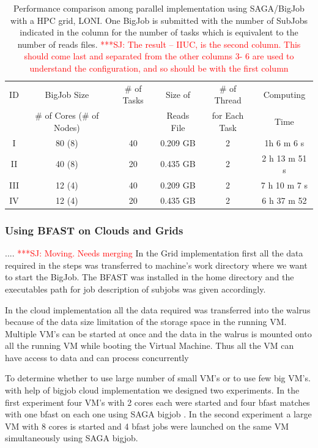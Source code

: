 \documentclass[12pt]{article}
\newcommand{\jhanote}[1]{ {\textcolor{red}     {***SJ: #1}}}
\newcommand{\jhanote}[1]{}
\begin{document}
 \begin{table}
 \begin{tabular}{|ccccc|c |} 
 \hline 
ID & BigJob Size  &  \# of Tasks & Size of  & \# of Thread  &   Computing  \\
   & \# of Cores (\# of Nodes) &  & Reads File & for Each Task &  Time\\\hline
I   & 80  (8) &  40 & 0.209 GB & 2 & 1h 6 m 6 s \\
II  & 40 (8)  &  20 & 0.435 GB & 2 & 2 h 13 m 51 s\\
III & 12 (4)  & 40  & 0.209 GB & 2 & 7 h 10 m 7 s \\
IV & 12 (4)  & 20 & 0.435 GB & 2 &  6 h 37 m 52  \\
\hline
\end{tabular}
\caption{Performance comparison among parallel implementation using SAGA/BigJob with a HPC grid, LONI. One BigJob is submitted with the number of SubJobs indicated in the column for the number of tasks which is equivalent to the number of reads files.\jhanote{The result -- IIUC, is the second column. This should come last and separated from the other columns 3- 6 are used to understand the configuration, and so should be with the first column}}
  \label{table:bigjob-loni} 
\end{table}
 


\subsubsection{Using BFAST on Clouds and Grids}

.... \jhanote{Moving. Needs merging} In the Grid implementation first all the data required in the steps was transferred to machine's work directory where we want to start the BigJob. The BFAST was installed in the home directory and the executables path for job description of subjobs was given accordingly.

In the cloud implementation all the data required was transferred into the walrus because of the data size limitation of the storage space in the running VM. Multiple VM's can be started at once and the data in the walrus is mounted onto all the running VM while booting the Virtual Machine. Thus all the VM can have access to data and can process concurrently



To determine whether to use large number of small VM's or to use few big VM's. with help of bigjob cloud implementation we designed two experiments. In the first experiment four VM's with 2 cores each were started and four bfast matches with one bfast on each one using SAGA bigjob . In the second experiment a large VM with 8 cores is started and 4 bfast jobs were launched on the same VM simultaneously using SAGA bigjob.
\end{document}
